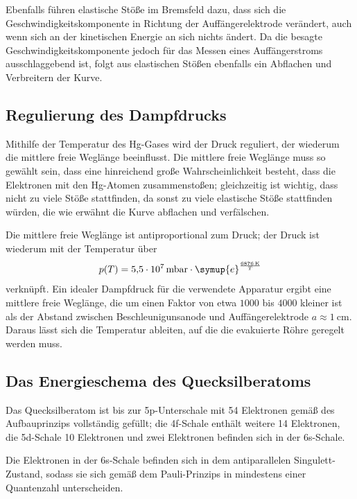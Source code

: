 Ebenfalls führen elastische Stöße im Bremsfeld dazu, dass sich die Geschwindigkeitskomponente in Richtung der Auffängerelektrode
verändert, auch wenn sich an der kinetischen Energie an sich nichts ändert. 
Da die besagte Geschwindigkeitskomponente jedoch für das Messen eines Auffängerstroms ausschlaggebend ist, folgt aus elastischen
Stößen ebenfalls ein Abflachen und Verbreitern der Kurve. 

\subsection{Regulierung des Dampfdrucks}

Mithilfe der Temperatur des Hg-Gases wird der Druck reguliert, der wiederum die mittlere freie Weglänge beeinflusst. 
Die mittlere freie Weglänge muss so gewählt sein, dass eine hinreichend große Wahrscheinlichkeit besteht, dass die Elektronen 
mit den Hg-Atomen zusammenstoßen; gleichzeitig ist wichtig, dass nicht zu viele Stöße stattfinden, da sonst  
zu viele elastische Stöße stattfinden würden, die wie erwähnt die Kurve abflachen und verfälschen. 

Die mittlere freie Weglänge ist antiproportional zum Druck; der Druck ist wiederum mit der Temperatur über 
\begin{equation*}
    p(T)=\SI{5.5e7}{\milli\bar}\cdot \symup{e}^{\frac{\SI{6876}{\kelvin}}{T}}
\end{equation*}
verknüpft. 
Ein idealer Dampfdruck für die verwendete Apparatur ergibt eine mittlere freie Weglänge, die um einen Faktor von etwa 
$1000$ bis $4000$ kleiner ist als der Abstand zwischen Beschleunigunsanode und Auffängerelektrode $a\approx \SI{1}{\centi\meter}$. 
Daraus lässt sich die Temperatur ableiten, auf die die evakuierte Röhre geregelt werden muss. 

\subsection{Das Energieschema des Quecksilberatoms}

Das Quecksilberatom ist bis zur 5p-Unterschale mit 54 Elektronen gemäß des Aufbauprinzips vollständig gefüllt; 
die 4f-Schale enthält weitere 14 Elektronen, die 5d-Schale 10 Elektronen und zwei Elektronen befinden sich in der 6s-Schale. 

Die Elektronen in der 6s-Schale befinden sich in dem antiparallelen Singulett-Zustand, sodass sie sich gemäß dem Pauli-Prinzips 
in mindestens einer Quantenzahl unterscheiden. 
